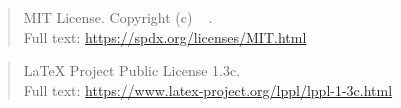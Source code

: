 %

\makeatletter
\expandafter\def\csname qtex@licensetext@MIT\endcsname{%
  \begin{quote}\small\raggedright
    MIT License. Copyright (c) \ifstrempty{\qtex@licenseyear}{\number\year}{\qtex@licenseyear}\ %
    \ifstrempty{\qtex@copyrightholder}{\qtex@author}{\qtex@copyrightholder}.\\
    Full text: \url{https://spdx.org/licenses/MIT.html}
  \end{quote}%
}
\expandafter\def\csname qtex@licensetext@LPPL-1.3c\endcsname{%
  \begin{quote}\small\raggedright
    LaTeX Project Public License 1.3c.\\
    Full text: \url{https://www.latex-project.org/lppl/lppl-1-3c.html}
  \end{quote}%
}
\makeatother
